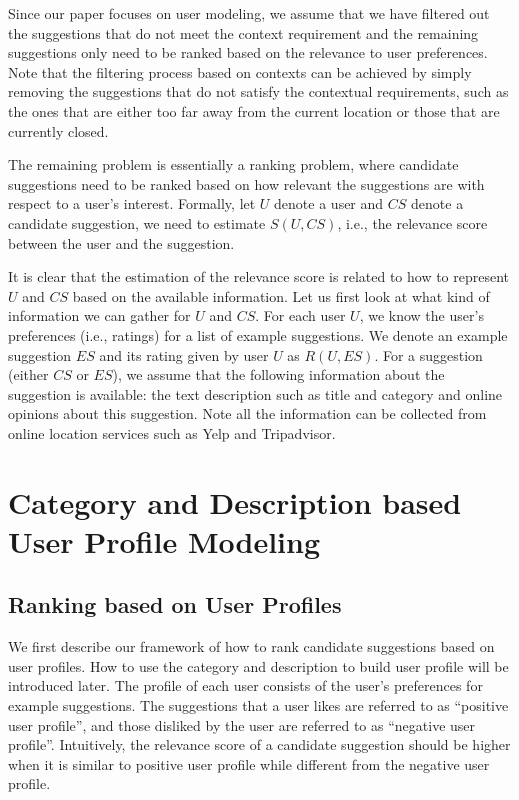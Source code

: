 Since our paper focuses on user modeling, we assume 
that we have filtered out the suggestions that do not meet the context requirement 
and the remaining suggestions
only need to be ranked based on the relevance to 
user preferences. Note that the filtering process 
based on contexts can be achieved by simply removing 
the suggestions that do not satisfy the contextual 
requirements, such as the ones that are either 
too far away from the current location or those 
that are currently closed. 

The remaining problem is essentially a ranking 
problem, where candidate suggestions need to 
be ranked based on how relevant the suggestions
are with respect to a user's interest. 
Formally, let $U$ denote a user and $CS$ denote a 
candidate suggestion, we need to estimate 
$S(U,CS)$, i.e., the relevance score between 
the user and the suggestion. 

It is clear that the estimation of the relevance 
score is related to how to represent $U$ 
and $CS$ based on the available information. 
Let us first look at what kind of 
information we can gather for $U$ and $CS$.  
For each user $U$, 
we know the user's preferences (i.e., ratings) for a list of 
example suggestions. We denote an example suggestion $ES$ 
and its rating given by user $U$ as $R(U,ES)$.  For a 
suggestion (either $CS$ or $ES$), we assume that the 
following information about the suggestion is available: 
the text description such as title and category and online 
opinions about this suggestion. 
Note all the information can be collected from online location 
services such as Yelp and Tripadvisor. 


\section{Category and Description based User Profile Modeling}

\subsection{Ranking based on User Profiles}

We first describe our framework of how to rank candidate suggestions 
based on user profiles. How to use the category and description to build 
user profile will be introduced later. 
The profile of each user consists of the user's 
preferences for example suggestions. The suggestions that a 
user likes are referred to as ``positive user profile'', and those
disliked by the user are referred to as ``negative user profile''. 
Intuitively, the relevance score of a candidate suggestion should 
be higher when it is similar to positive user profile while different
from the negative user profile. 

